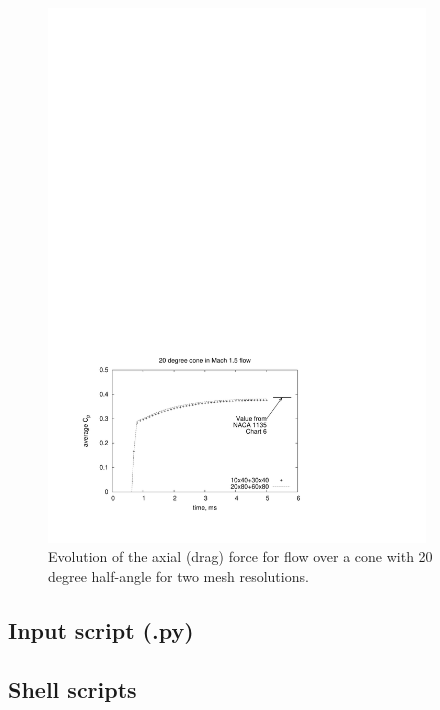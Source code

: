 \begin{figure}[htbp]
\begin{center}
\includegraphics[width=10cm, viewport=52 49 401 294]{../2D/cone20-simple/cone20_cp.pdf}
\end{center}
\caption{Evolution of the axial (drag) force
         for flow over a cone with 20 degree half-angle
	 for two mesh resolutions.}
\label{cone20-axial-force-fig}
\end{figure}

\newpage

\subsection{Input script (.py)}
\topbar

\bottombar


\subsection{Shell scripts}
\label{cone20-sh-files}
\topbar

\bottombar

